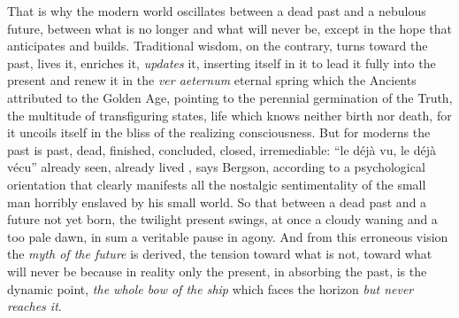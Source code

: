 That is why the modern world oscillates between a dead past and a nebulous future, between what is no longer and what will never be, except in the hope that anticipates and builds. Traditional wisdom, on the contrary, turns toward the past, lives it, enriches it, \emph{updates} it, inserting itself in it to lead it fully into the present and renew it in the \emph{ver aeternum} eternal spring which the Ancients attributed to the Golden Age, pointing to the perennial germination of the Truth, the multitude of transfiguring states, life which knows neither birth nor death, for it uncoils itself in the bliss of the realizing consciousness. But for moderns the past is past, dead, finished, concluded, closed, irremediable: ``le déjà vu, le déjà vécu'' already seen, already lived , says Bergson, according to a psychological orientation that clearly manifests all the nostalgic sentimentality of the small man horribly enslaved by his small world. So that between a dead past and a future not yet born, the twilight present swings, at once a cloudy waning and a too pale dawn, in sum a veritable pause in agony. And from this erroneous vision the \emph{myth of the future} is derived, the tension toward what is not, toward what will never be because in reality only the present, in absorbing the past, is the dynamic point, \emph{the whole bow of the ship} which faces the horizon \emph{but never reaches it}.



